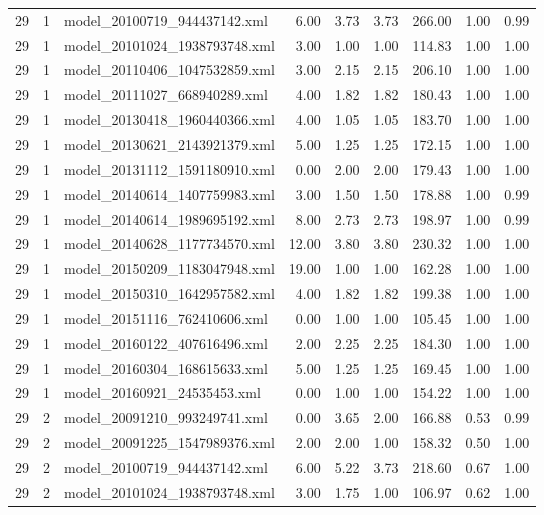 \begin{table}[ht]
\begin{tabular}{rrlrrrrrr}
   29 &   1 & model\_20100719\_944437142.xml & 6.00 & 3.73 & 3.73 & 266.00 & 1.00 & 0.99 \\ 
   29 &   1 & model\_20101024\_1938793748.xml & 3.00 & 1.00 & 1.00 & 114.83 & 1.00 & 1.00 \\ 
   29 &   1 & model\_20110406\_1047532859.xml & 3.00 & 2.15 & 2.15 & 206.10 & 1.00 & 1.00 \\ 
   29 &   1 & model\_20111027\_668940289.xml & 4.00 & 1.82 & 1.82 & 180.43 & 1.00 & 1.00 \\ 
   29 &   1 & model\_20130418\_1960440366.xml & 4.00 & 1.05 & 1.05 & 183.70 & 1.00 & 1.00 \\ 
   29 &   1 & model\_20130621\_2143921379.xml & 5.00 & 1.25 & 1.25 & 172.15 & 1.00 & 1.00 \\ 
   29 &   1 & model\_20131112\_1591180910.xml & 0.00 & 2.00 & 2.00 & 179.43 & 1.00 & 1.00 \\ 
   29 &   1 & model\_20140614\_1407759983.xml & 3.00 & 1.50 & 1.50 & 178.88 & 1.00 & 0.99 \\ 
   29 &   1 & model\_20140614\_1989695192.xml & 8.00 & 2.73 & 2.73 & 198.97 & 1.00 & 0.99 \\ 
   29 &   1 & model\_20140628\_1177734570.xml & 12.00 & 3.80 & 3.80 & 230.32 & 1.00 & 1.00 \\ 
   29 &   1 & model\_20150209\_1183047948.xml & 19.00 & 1.00 & 1.00 & 162.28 & 1.00 & 1.00 \\ 
   29 &   1 & model\_20150310\_1642957582.xml & 4.00 & 1.82 & 1.82 & 199.38 & 1.00 & 1.00 \\ 
   29 &   1 & model\_20151116\_762410606.xml & 0.00 & 1.00 & 1.00 & 105.45 & 1.00 & 1.00 \\ 
   29 &   1 & model\_20160122\_407616496.xml & 2.00 & 2.25 & 2.25 & 184.30 & 1.00 & 1.00 \\ 
   29 &   1 & model\_20160304\_168615633.xml & 5.00 & 1.25 & 1.25 & 169.45 & 1.00 & 1.00 \\ 
   29 &   1 & model\_20160921\_24535453.xml & 0.00 & 1.00 & 1.00 & 154.22 & 1.00 & 1.00 \\ 
   29 &   2 & model\_20091210\_993249741.xml & 0.00 & 3.65 & 2.00 & 166.88 & 0.53 & 0.99 \\ 
   29 &   2 & model\_20091225\_1547989376.xml & 2.00 & 2.00 & 1.00 & 158.32 & 0.50 & 1.00 \\ 
   29 &   2 & model\_20100719\_944437142.xml & 6.00 & 5.22 & 3.73 & 218.60 & 0.67 & 1.00 \\ 
   29 &   2 & model\_20101024\_1938793748.xml & 3.00 & 1.75 & 1.00 & 106.97 & 0.62 & 1.00 \\ 

\end{tabular}
\end{table}
